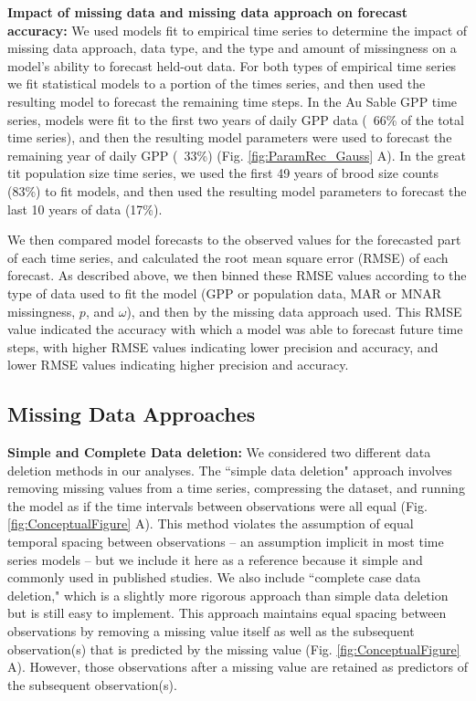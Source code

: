 \documentclass{article}
\begin{document}
\noindent\textbf{Impact of missing data and missing data approach on forecast accuracy:} 
We used models fit to empirical time series to determine the impact of missing data approach, data type, and the type and amount of missingness on a model's ability to forecast held-out data. For both types of empirical time series we fit statistical models to a portion of the times series, and then used the resulting model to forecast the remaining time steps. In the Au Sable GPP time series, models were fit to the first two years of daily GPP data (~66\% of the total time series), and then the resulting model parameters were used to forecast the remaining year of daily GPP (~33\%) (Fig. \ref{fig:ParamRec_Gauss} A). In the great tit population size time series, we used the first 49 years of brood size counts (83\%) to fit models, and then used the resulting model parameters to forecast the last 10 years of data (17\%).

We then compared model forecasts to the observed values for the forecasted part of each time series, and calculated the root mean square error (RMSE) of each forecast. As described above, we then binned these RMSE values according to the type of data used to fit the model (GPP or population data, MAR or MNAR missingness, $p$, and $\omega$), and then by the missing data approach used. This RMSE value indicated the accuracy with which a model was able to forecast future time steps, with higher RMSE values indicating lower precision and accuracy, and lower RMSE values indicating higher precision and accuracy.     


\subsection*{Missing Data Approaches}

\noindent\textbf{Simple and Complete Data deletion:} 
We considered two different data deletion methods in our analyses. The ``simple data deletion" approach involves removing missing values from a time series, compressing the dataset, and running the model as if the time intervals between observations were all equal (Fig. \ref{fig:ConceptualFigure} A). This method violates the assumption of equal temporal spacing between observations -- an assumption implicit in most time series models -- but we include it here as a reference because it simple and commonly used in published studies. We also include ``complete case data deletion," which is a slightly more rigorous approach than simple data deletion but is still easy to implement. This approach maintains equal spacing between observations by removing a missing value itself as well as the subsequent observation(s) that is predicted by the missing value (Fig. \ref{fig:ConceptualFigure} A). However, those observations after a missing value are retained as predictors of the subsequent observation(s). 
\end{document}
